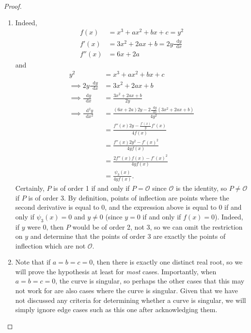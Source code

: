 \documentclass[12pt]{article}
\newcommand{\dd}{\mathop{}\!\mathrm{d}}
\theoremstyle{definition}
\begin{document}
\begin{proof}\
	\begin{enumerate}[label=(\alph*)]
		\item Indeed, \begin{align*}
			      f(x)   & = x^3 + ax^2 + bx + c = y^2               \\
			      f'(x)  & = 3x^2 + 2ax + b = 2y \frac{\dd y}{\dd x} \\
			      f''(x) & = 6x + 2a
		      \end{align*}
		      and \begin{align*}
			      y^2                              & = x^3 + ax^2 + bx + c                                         \\
			      \implies 2y \frac{\dd y}{\dd x}  & = 3x^2 + 2ax + b                                              \\
			      \implies \frac{\dd y}{\dd x}     & = \frac{3x^2 + 2ax + b}{2y}                                   \\
			      \implies \frac{\dd^2 y}{\dd x^2} & = \frac{(6x+2a)2y - 2\frac{\dd y}{\dd x}(3x^2 + 2ax+b)}{4y^2} \\
			                                       & = \frac{f''(x)2y - \frac{f'(x)}{y}f'(x)}{4f(x)}               \\
			                                       & = \frac{f''(x)2y^2 - f'(x)^2}{4yf(x)}                         \\
			                                       & = \frac{2f''(x)f(x) - f'(x)^2}{4yf(x)}                        \\
			                                       & = \frac{\psi_3(x)}{4yf(x)}.
		      \end{align*}
		      Certainly, $P$ is of order 1 if and only if $P = \mathcal{O}$ since $\mathcal{O}$ is the identity, so $P \neq \mathcal{O}$ if $P$ is of order 3.
		      By definition, points of inflection are points where the second derivative is equal to 0, and the expression above is equal to 0 if and only if $\psi_3(x) = 0$ and $y \neq 0$ (since $y = 0$ if and only if $f(x) = 0$).
		      Indeed, if $y$ were 0, then $P$ would be of order 2, not 3, so we can omit the restriction on $y$ and determine that the points of order 3 are exactly the points of inflection which are not $\mathcal{O}$.
		\item Note that if $a = b = c = 0$, then there is exactly one distinct real root, so we will prove the hypothesis at least for \textit{most} cases.
		      Importantly, when $a = b = c = 0$, the curve is singular, so perhaps the other cases that this may not work for are also cases where the curve is singular.
		      Given that we have not discussed any criteria for determining whether a curve is singular, we will simply ignore edge cases such as this one after acknowledging them.


\end{enumerate}
\end{proof}
\end{document}

